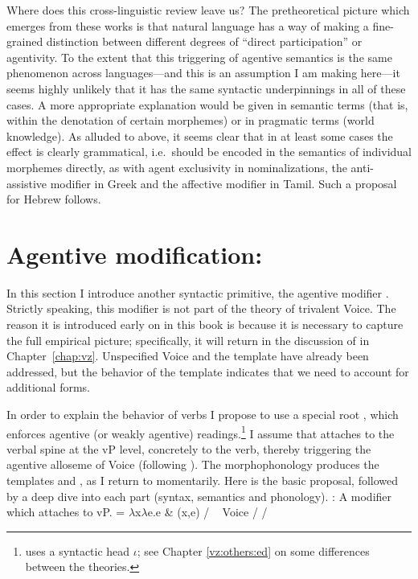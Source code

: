 {Where does this cross-linguistic review leave us? The pretheoretical picture which emerges from these works is that natural language has a way of making a fine-grained distinction between different degrees of ``direct participation'' or agentivity. To the extent that this triggering of agentive semantics is the same phenomenon across languages---and this is an assumption I am making here---it seems highly unlikely that it has the same syntactic underpinnings in all of these cases. A more appropriate explanation would be given in semantic terms (that is, within the denotation of certain morphemes) or in pragmatic terms (world knowledge). As alluded to above, it seems clear that in at least some cases the effect is clearly grammatical, i.e.~should be encoded in the semantics of individual morphemes directly, as with agent exclusivity in nominalizations, the anti-assistive modifier in Greek and the affective modifier in Tamil. Such a proposal for Hebrew follows.

\section{Agentive modification: \va} \label{voice:va}
In this section I introduce another syntactic primitive, the agentive modifier {\va}. Strictly speaking, this modifier is not part of the theory of trivalent Voice. The reason it is introduced early on in this book is because it is necessary to capture the full empirical picture; specifically, it will return in the discussion of {\vz} in Chapter~\ref{chap:vz}. Unspecified Voice and the template {\tkal} have already been addressed, but the behavior of the template {\tpie} indicates that we need to account for additional forms.

In order to explain the behavior of verbs {\tpie} I propose to use a special root {\va}, which enforces agentive (or weakly agentive) readings.\footnote{\cite{doron03} uses a syntactic head $\iota$; see Chapter \ref{vz:others:ed} on some differences between the theories.} I assume that {\va} attaches to the verbal spine at the vP level, concretely to the verb, thereby triggering the agentive alloseme of Voice (following \citealt{doron03,doron14adj}). The morphophonology produces the templates {\tpie} and {\thit}, as I return to momentarily. Here is the basic proposal, followed by a deep dive into each part (syntax, semantics and phonology).
\pex {\va}:
	\a A modifier which attaches to vP.
	\a {} = $\lambda$x$\lambda$e.e \& (x,e) / \trace~\va
	\a Voice {\lra} {\tpie} / {\trace} {\va}
	\a {\vz} {\lra} {\thit} / {\trace} {\va}
\xe

}
